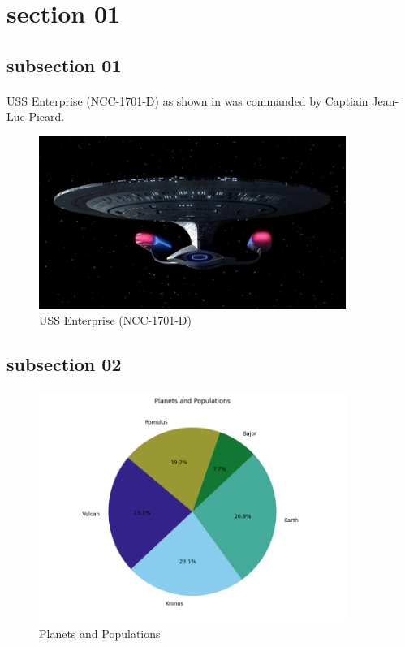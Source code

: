 \documentclass[class=book, crop=false]{standalone}
\begin{document}
\section{section 01}

\subsection{subsection 01}

\paragraph*{}
\blindtext\cite{latex2e}
USS Enterprise (NCC-1701-D) as shown in  was commanded by Captiain Jean-Luc Picard.

\begin{figure}[htbp] 
    \centering
    \includegraphics[width=10cm]{../../../figures_and_plots/figures/Enterprise_Forward.jpg}
    \caption{USS Enterprise (NCC-1701-D)}
    \label{fig:uss_enterprise}
\end{figure}

\paragraph*{}
\blindtext

\subsection{subsection 02}

\paragraph*{}
\Blindtext

\begin{figure}[htbp]
    \centering
    \includegraphics[width=10cm]{src/contents/figures_and_plots/plots/planets_and_populations.png}
    \caption{Planets and Populations}
    \label{fig:planets}
\end{figure}

\paragraph*{}
\blindmathpaper\cite{latex2e}
\end{document}

